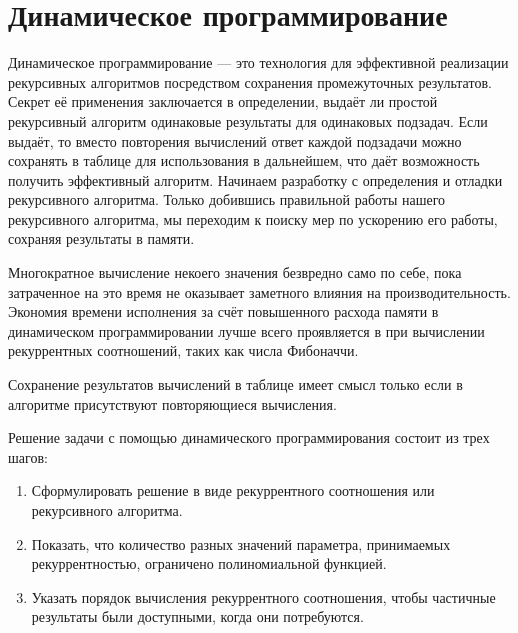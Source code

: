 \documentclass[14pt]{book}
\begin{document}


\chapter{Динамическое программирование}

Динамическое программирование --- это технология для эффективной реализации рекурсивных алгоритмов
посредством сохранения промежуточных результатов. Секрет её применения заключается
в определении, выдаёт ли простой рекурсивный алгоритм одинаковые результаты для одинаковых
подзадач. Если выдаёт, то вместо повторения вычислений ответ каждой подзадачи можно
сохранять в таблице для использования в дальнейшем, что даёт возможность получить эффективный
алгоритм. Начинаем разработку с определения и отладки рекурсивного алгоритма. Только добившись
правильной работы нашего рекурсивного алгоритма, мы переходим к поиску мер по ускорению
его работы, сохраняя результаты в памяти.

Многократное вычисление некоего значения безвредно само по себе, пока затраченное на это время
не оказывает заметного влияния на производительность. Экономия времени исполнения за счёт повышенного
расхода памяти в динамическом программировании лучше всего проявляется в при вычислении
рекуррентных соотношений, таких как числа Фибоначчи.

Сохранение результатов вычислений в таблице имеет смысл только если в алгоритме присутствуют
повторяющиеся вычисления. 

Решение задачи с помощью динамического программирования состоит из трех шагов:
\begin{enumerate}
\item Сформулировать решение в виде рекуррентного соотношения или рекурсивного алгоритма.
\item Показать, что количество разных значений параметра, принимаемых рекуррентностью,
      ограничено полиномиальной функцией.
\item Указать порядок вычисления рекуррентного соотношения, чтобы частичные результаты
      были доступными, когда они потребуются.
\end{enumerate}
\end{document}

